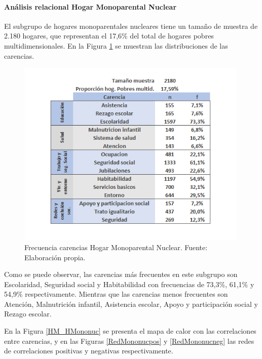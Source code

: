 \documentclass[12pt,letterpaper,spanish]{article}
\begin{document}
\paragraph{Análisis relacional Hogar Monoparental Nuclear}
El subgrupo de hogares monoparentales nucleares tiene un tamaño de muestra de 2.180 hogares, que representan el 17,6\% del total de hogares pobres multidimensionales. En la Figura \ref{freHMononuc} se muestran las distribuciones de las carencias.
\begin{figure}[H]
  \centering
    \includegraphics[height=9cm]{HOGARES/tabla_mononuc.png}
    \caption{Frecuencia carencias Hogar Monoparental Nuclear. Fuente: Elaboración propia.}
    \label{freHMononuc}
\end{figure}
Como se puede observar, las carencias más frecuentes en este subgrupo son Escolaridad, Seguridad social y Habitabilidad con frecuencias de 73,3\%, 61,1\% y 54,9\% respectivamente. Mientras que las carencias menos frecuentes son Atención, Malnutrición infantil, Asistencia escolar, Apoyo y participación social y Rezago escolar.

En la Figura \ref{HM_HMononuc} se presenta el mapa de calor con las correlaciones entre carencias, y en las Figuras \ref{RedMononucpos} y \ref{RedMononucneg} las redes de correlaciones positivas y negativas respectivamente.
\end{document}
